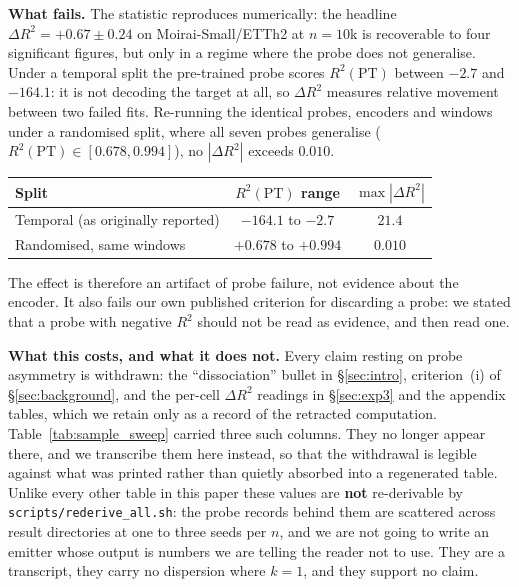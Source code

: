 \textbf{What fails.} The statistic reproduces numerically: the headline
$\Delta R^2{=}{+}0.67{\pm}0.24$ on Moirai-Small/ETTh2 at $n{=}10$k is
recoverable to four significant figures, but only in a regime where the
probe does not generalise. Under a temporal split the pre-trained probe
scores $R^2(\text{PT})$ between $-2.7$ and $-164.1$: it is not decoding the
target at all, so $\Delta R^2$ measures relative movement between two failed
fits. Re-running the identical probes, encoders and windows under a
randomised split, where all seven probes generalise
($R^2(\text{PT}) \in [0.678, 0.994]$), no $|\Delta R^2|$ exceeds $0.010$.

\begin{center}
\small
\begin{tabular}{@{}lcc@{}}
\toprule
Split & $R^2(\text{PT})$ range & $\max |\Delta R^2|$ \\
\midrule
Temporal (as originally reported) & $-164.1$ to $-2.7$ & $21.4$ \\
Randomised, same windows          & $+0.678$ to $+0.994$ & $\mathbf{0.010}$ \\
\bottomrule
\end{tabular}
\end{center}

The effect is therefore an artifact of probe failure, not evidence about the
encoder. It also fails our own published criterion for discarding a probe: we
stated that a probe with negative $R^2$ should not be read as evidence, and
then read one.

\textbf{What this costs, and what it does not.} Every claim resting on probe
asymmetry is withdrawn: the ``dissociation'' bullet in
\S\ref{sec:intro}, criterion~(i) of \S\ref{sec:background}, and the
per-cell $\Delta R^2$ readings in \S\ref{sec:exp3} and the appendix
tables, which we retain only as a record of the retracted computation.
Table~\ref{tab:sample_sweep} carried three such columns.  They no longer appear
there, and we transcribe them here instead, so that the withdrawal is legible
against what was printed rather than quietly absorbed into a regenerated table.
Unlike every other table in this paper these values are \textbf{not}
re-derivable by \texttt{scripts/rederive\_all.sh}: the probe records behind them
are scattered across result directories at one to three seeds per $n$, and we
are not going to write an emitter whose output is numbers we are telling the
reader not to use.  They are a transcript, they carry no dispersion where
$k{=}1$, and they support no claim.

